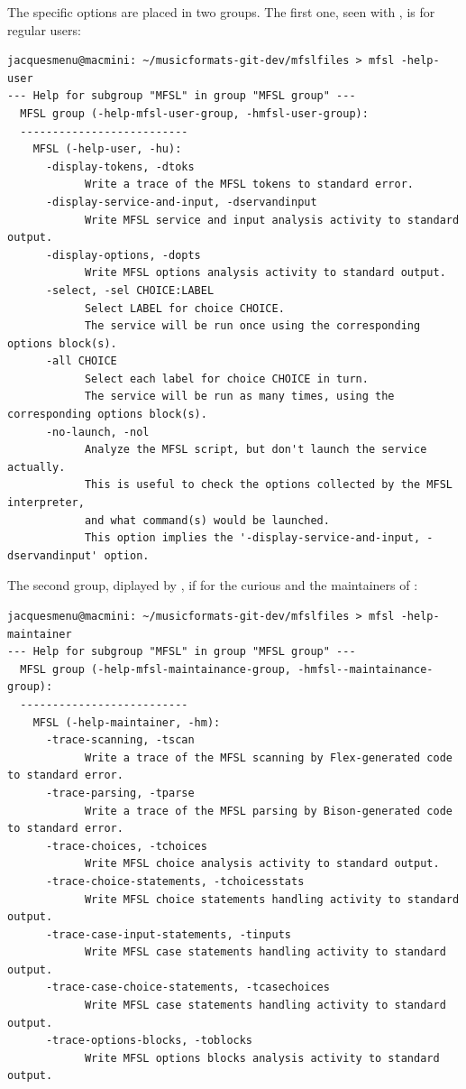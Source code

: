The specific options are placed in two groups. The first one, seen with , is for regular users:
\begin{lstlisting}[language=Terminal]
jacquesmenu@macmini: ~/musicformats-git-dev/mfslfiles > mfsl -help-user
--- Help for subgroup "MFSL" in group "MFSL group" ---
  MFSL group (-help-mfsl-user-group, -hmfsl-user-group):
  --------------------------
    MFSL (-help-user, -hu):
      -display-tokens, -dtoks
            Write a trace of the MFSL tokens to standard error.
      -display-service-and-input, -dservandinput
            Write MFSL service and input analysis activity to standard output.
      -display-options, -dopts
            Write MFSL options analysis activity to standard output.
      -select, -sel CHOICE:LABEL
            Select LABEL for choice CHOICE.
            The service will be run once using the corresponding options block(s).
      -all CHOICE
            Select each label for choice CHOICE in turn.
            The service will be run as many times, using the corresponding options block(s).
      -no-launch, -nol
            Analyze the MFSL script, but don't launch the service actually.
            This is useful to check the options collected by the MFSL interpreter,
            and what command(s) would be launched.
            This option implies the '-display-service-and-input, -dservandinput' option.
\end{lstlisting}

The second group, diplayed by , if for the curious and the maintainers of \mf:
\begin{lstlisting}[language=Terminal]
jacquesmenu@macmini: ~/musicformats-git-dev/mfslfiles > mfsl -help-maintainer
--- Help for subgroup "MFSL" in group "MFSL group" ---
  MFSL group (-help-mfsl-maintainance-group, -hmfsl--maintainance-group):
  --------------------------
    MFSL (-help-maintainer, -hm):
      -trace-scanning, -tscan
            Write a trace of the MFSL scanning by Flex-generated code to standard error.
      -trace-parsing, -tparse
            Write a trace of the MFSL parsing by Bison-generated code to standard error.
      -trace-choices, -tchoices
            Write MFSL choice analysis activity to standard output.
      -trace-choice-statements, -tchoicesstats
            Write MFSL choice statements handling activity to standard output.
      -trace-case-input-statements, -tinputs
            Write MFSL case statements handling activity to standard output.
      -trace-case-choice-statements, -tcasechoices
            Write MFSL case statements handling activity to standard output.
      -trace-options-blocks, -toblocks
            Write MFSL options blocks analysis activity to standard output.
\end{lstlisting}


